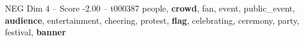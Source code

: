 \begin{textsample}{NEG Dim 4 – Score -2.00 – t000387}  \label{ex:f4_neg_033}
people, \textbf{crowd}, fan, event, public\_event, \textbf{audience}, entertainment, cheering, protest, \textbf{flag}, celebrating, ceremony, party, festival, \textbf{banner}

\end{textsample}

